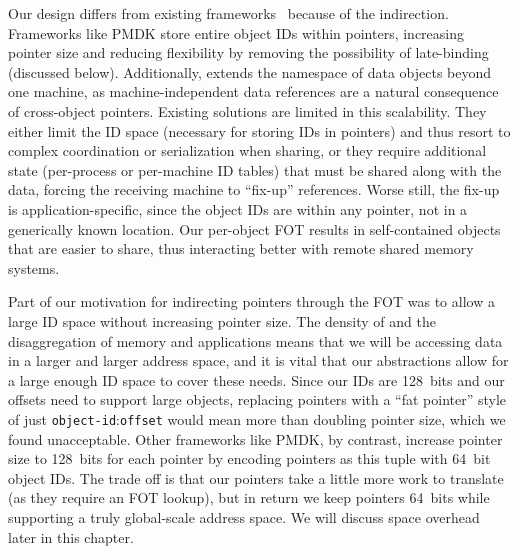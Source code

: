 Our design differs from existing
frameworks~\cite{corbato_introduction_1965,bensoussan:sosp69,daley:cacm68,pmdk-pointers,libpmem,Chen:micro17}
because of the indirection. Frameworks like PMDK store entire object IDs within pointers,
increasing pointer size and reducing flexibility by removing
the possibility of late-binding (discussed below). Additionally, \Twizzler extends the
namespace of data objects beyond one machine, as machine-independent data references
are a natural consequence of cross-object pointers. Existing solutions are limited
in this scalability. They either limit the ID space (necessary for storing IDs
in pointers) and thus resort to complex coordination or serialization when sharing, or
they require additional state (\eg per-process or per-machine ID tables) that must
be shared along with the data, forcing the receiving machine to ``fix-up''
references. Worse still, the fix-up is application-specific, since the object IDs are
within any pointer, not in a generically known location.
Our per-object FOT results in self-contained objects that are easier to share, thus interacting better with remote shared memory systems.

Part of our motivation for indirecting pointers through the FOT was to allow a large ID space
without increasing pointer size. The density of \NVM and the disaggregation of memory and
applications means that we will be accessing data in a larger and larger address space, and it is
vital that our abstractions allow for a large enough ID space to cover these needs. Since our IDs
are 128~bits and our offsets need to support large objects, replacing pointers with a ``fat
pointer'' style of just \texttt{object-id}:\texttt{offset} would mean more than doubling pointer
size, which we found unacceptable. Other frameworks like PMDK, by contrast, increase pointer size to 128~bits for each
pointer by encoding pointers as this tuple with 64~bit object IDs. The trade off is that our
pointers take a little more work to translate (as they require an FOT lookup), but in return we keep
pointers 64~bits while supporting a truly global-scale address space. We will discuss space overhead later in this chapter.



